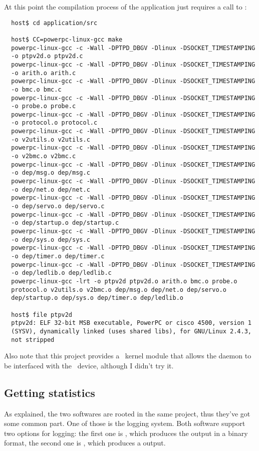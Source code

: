         At this point the compilation process of the application just
        requires a call to :
\begin{lstlisting}
  host$ cd application/src

  host$ CC=powerpc-linux-gcc make
  powerpc-linux-gcc -c -Wall -DPTPD_DBGV -Dlinux -DSOCKET_TIMESTAMPING
  -o ptpv2d.o ptpv2d.c
  powerpc-linux-gcc -c -Wall -DPTPD_DBGV -Dlinux -DSOCKET_TIMESTAMPING
  -o arith.o arith.c
  powerpc-linux-gcc -c -Wall -DPTPD_DBGV -Dlinux -DSOCKET_TIMESTAMPING
  -o bmc.o bmc.c
  powerpc-linux-gcc -c -Wall -DPTPD_DBGV -Dlinux -DSOCKET_TIMESTAMPING
  -o probe.o probe.c
  powerpc-linux-gcc -c -Wall -DPTPD_DBGV -Dlinux -DSOCKET_TIMESTAMPING
  -o protocol.o protocol.c
  powerpc-linux-gcc -c -Wall -DPTPD_DBGV -Dlinux -DSOCKET_TIMESTAMPING
  -o v2utils.o v2utils.c
  powerpc-linux-gcc -c -Wall -DPTPD_DBGV -Dlinux -DSOCKET_TIMESTAMPING
  -o v2bmc.o v2bmc.c
  powerpc-linux-gcc -c -Wall -DPTPD_DBGV -Dlinux -DSOCKET_TIMESTAMPING
  -o dep/msg.o dep/msg.c
  powerpc-linux-gcc -c -Wall -DPTPD_DBGV -Dlinux -DSOCKET_TIMESTAMPING
  -o dep/net.o dep/net.c
  powerpc-linux-gcc -c -Wall -DPTPD_DBGV -Dlinux -DSOCKET_TIMESTAMPING
  -o dep/servo.o dep/servo.c
  powerpc-linux-gcc -c -Wall -DPTPD_DBGV -Dlinux -DSOCKET_TIMESTAMPING
  -o dep/startup.o dep/startup.c
  powerpc-linux-gcc -c -Wall -DPTPD_DBGV -Dlinux -DSOCKET_TIMESTAMPING
  -o dep/sys.o dep/sys.c
  powerpc-linux-gcc -c -Wall -DPTPD_DBGV -Dlinux -DSOCKET_TIMESTAMPING
  -o dep/timer.o dep/timer.c
  powerpc-linux-gcc -c -Wall -DPTPD_DBGV -Dlinux -DSOCKET_TIMESTAMPING
  -o dep/ledlib.o dep/ledlib.c
  powerpc-linux-gcc -lrt -o ptpv2d ptpv2d.o arith.o bmc.o probe.o
  protocol.o v2utils.o v2bmc.o dep/msg.o dep/net.o dep/servo.o
  dep/startup.o dep/sys.o dep/timer.o dep/ledlib.o

  host$ file ptpv2d
  ptpv2d: ELF 32-bit MSB executable, PowerPC or cisco 4500, version 1
  (SYSV), dynamically linked (uses shared libs), for GNU/Linux 2.4.3,
  not stripped
\end{lstlisting}

        Also note that this project provides a \Linux\ kernel module that
        allows the daemon to be interfaced with the \Vitesse\ device,
        although I didn't try it.

\subsection{ Getting statistics } \label{sub:Stats}

    As explained, the two softwares are rooted in the same project, thus
    they've got some common part. One of those is the logging system. Both
    software support two options for logging: the first one is ,
    which produces the output in a binary format, the second one is
    , which produces a  output.

